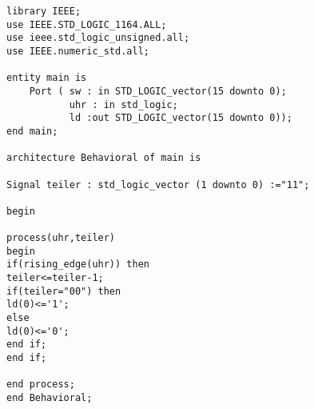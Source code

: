 \documentclass{article}
\begin{document}
\begin{verbatim}
library IEEE;
use IEEE.STD_LOGIC_1164.ALL;
use ieee.std_logic_unsigned.all;
use IEEE.numeric_std.all;

entity main is
    Port ( sw : in STD_LOGIC_vector(15 downto 0);
           uhr : in std_logic;
           ld :out STD_LOGIC_vector(15 downto 0));
end main;

architecture Behavioral of main is

Signal teiler : std_logic_vector (1 downto 0) :="11";

begin

process(uhr,teiler)
begin
if(rising_edge(uhr)) then
teiler<=teiler-1;
if(teiler="00") then
ld(0)<='1';
else
ld(0)<='0';
end if;
end if;

end process;
end Behavioral;
\end{verbatim}
\end{document}
